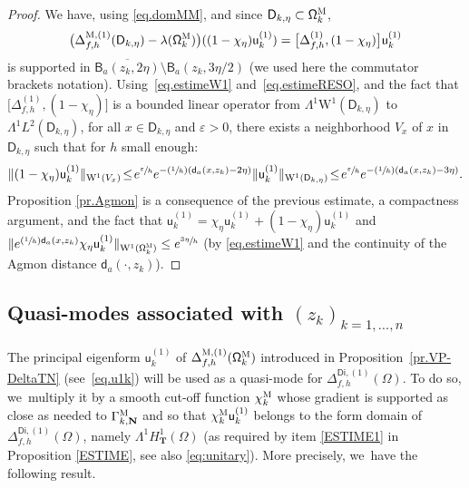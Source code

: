 \documentclass[JEP,XML,SOM,Unicode,NoEqCountersInSection,NoFloatCountersInSection,published]{cedram}
\newcommand{\Psfrac}[2]{(\sfrac{#1}{#2})}
\let\epsilon\varepsilon
\newcommand{\mbf}[1]{\mathbf{#1}}
\theoremstyle{plain}
\theoremstyle{definition}
\begin{document}
\begin{proof}
We have, using \eqref{eq.domMM}, and since $\mathsf D_{k,\eta}\subset \mathsf \Omega_k^{\textsc{M}}$,
\[
\bigl(\Delta_{f,h}^{\text{M}, (1)} (\mathsf D_{k,\eta}) - \lambda(\mathsf \Omega_k^{\textsc{M}}) \bigr) ((1-\chi_\eta)\mathsf u^{(1)}_k)= \big [ \Delta_{f,h}^{ (1)},(1-\chi_\eta)\big] \mathsf u^{(1)}_k
\]
is supported in $\overline{\mathsf B_{a}(z_k,2\eta)}\setminus \mathsf
B_{a}(z_k,3\eta/2)$ (we used here the commutator brackets notation).
Using~\eqref{eq.estimeW1} and~\eqref{eq.estimeRESO}, and the fact
that $\big [ \Delta_{f,h}^{ (1)},(1-\chi_\eta)\big] $ is a
bounded linear operator from $\Lambda^1\mathrm{W}^1(\mathsf
D_{k,\eta})$ to $\Lambda^1L^2(\mathsf D_{k,\eta})$, for all $x\in
\mathsf D_{k,\eta}$ and $\epsilon>0$, there exists a
neighborhood $V_x$ of $x$ in $\mathsf D_{k,\eta}$ such that for
$h$ small enough:
\[
\Vert (1-\chi_\eta)\mathsf u^{(1)}_k \Vert_{\mathrm W^1(V_x)} \!\le\! e^{\sfrac \epsilon h} e^{-\Psfrac 1h(\mathsf d_a(x,z_k)-2\eta)} \Vert \mathsf u^{(1)}_k \Vert _{\mathrm W^1(\mathsf D_{k,\eta})}\!\le\! e^{\sfrac \epsilon h} e^{-\Psfrac 1h(\mathsf d_a(x,z_k)-3\eta)}.
\]
Proposition \ref{pr.Agmon} is a consequence of the previous estimate,
a compactness argument, and the fact that $ \mathsf
u^{(1)}_k=\chi_\eta\mathsf u^{(1)}_k+(1-\chi_\eta)\mathsf u^{(1)}_k$
and $\Vert e^{\Psfrac 1h \mathsf d_a(x,z_k) } \chi_\eta \mathsf u^{(1)}_k \Vert _{\mathrm W^1(\mathsf \Omega_k^{\textsc{M}})}\le e^{\sfrac {3\eta}{h}}$ (by \eqref{eq.estimeW1} and the continuity of the Agmon distance $\mathsf d_a(\cdot,z_k)$).
\end{proof}

\subsection{Quasi-modes associated with $(z_k)_{k=1,\ldots,n}$}\label{sec:vk1}
The principal eigenform $\mathsf u^{(1)}_k$ of
$\Delta_{f,h}^{\textsc{M},(1)} (\mathsf \Omega_k^{\textsc{M}})$
introduced in Proposition~\ref{pr.VP-DeltaTN} (see~\eqref{eq.u1k}) will be used as a quasi-mode for $\Delta_{f,h}^{\mathsf{Di},(1)} (\Omega) $. To do so, we~multiply it by a smooth cut-off function $\chi_k^{\textsc{M}} $ whose gradient is supported as close as needed to $\Gamma_{k,\mbf N}^{\textsc{M}}$ and so that $\chi_k^{\textsc{M}} \mathsf u^{(1)}_k$ belongs to the form domain of $\Delta_{f,h}^{\mathsf{Di},(1)} (\Omega) $, namely $\Lambda^1H^1_{\mbf T}(\Omega) $ (as required by item \eqref{ESTIME1} in Proposition \ref{ESTIME}, see also \eqref{eq:unitary}). More precisely, we~have the following result.
\end{document}
